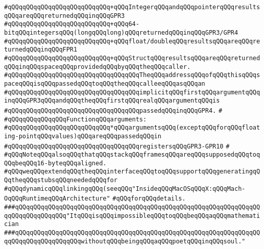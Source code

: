 \verb|#qQQqqQQqqQQqqQQqqQQqqQQqqQQq+qQQqIntegerqQQqandqQQqpointerqQQqresultsqQQqareqQQqreturnedqQQqinqQQqGPR3|\newline
\verb|#qQQqqQQqqQQqqQQqqQQqqQQqqQQq+qQQq64-bitqQQqintegersqQQq(longqQQqlong)qQQqreturnedqQQqinqQQqGPR3/GPR4|\newline
\verb|#qQQqqQQqqQQqqQQqqQQqqQQqqQQq+qQQqfloat/doubleqQQqresultsqQQqareqQQqreturnedqQQqinqQQqFPR1|\newline
\verb|#qQQqqQQqqQQqqQQqqQQqqQQqqQQq+qQQqStructqQQqresultsqQQqareqQQqreturnedqQQqinqQQqspaceqQQqprovidedqQQqbyqQQqtheqQQqcaller.|\newline
\verb|#qQQqqQQqqQQqqQQqqQQqqQQqqQQqqQQqqQQqTheqQQqaddressqQQqofqQQqthisqQQqspaceqQQqisqQQqpassedqQQqtoqQQqtheqQQqcalleeqQQqasqQQqan|\newline
\verb|#qQQqqQQqqQQqqQQqqQQqqQQqqQQqqQQqqQQqimplicitqQQqfirstqQQqargumentqQQqinqQQqGPR3qQQqandqQQqtheqQQqfirstqQQqrealqQQqargumentqQQqis|\newline
\verb|#qQQqqQQqqQQqqQQqqQQqqQQqqQQqqQQqqQQqpassedqQQqinqQQqGPR4.|\newline
\verb|#|\newline
\verb|#qQQqqQQqqQQqqQQqFunctionqQQqarguments:|\newline
\verb|#qQQqqQQqqQQqqQQqqQQqqQQqqQQq*qQQqargumentsqQQq(exceptqQQqforqQQqfloating-pointqQQqvalues)qQQqareqQQqpassedqQQqin|\newline
\verb|#qQQqqQQqqQQqqQQqqQQqqQQqqQQqqQQqqQQqregistersqQQqGPR3-GPR10|\newline
\verb|#|\newline
\verb|#qQQqNoteqQQqalsoqQQqthatqQQqstackqQQqframesqQQqareqQQqsupposedqQQqtoqQQqbeqQQq16-byteqQQqaligned.|\newline
\newline
\newline
\verb|#qQQqweqQQqextendqQQqtheqQQqinterfaceqQQqtoqQQqsupportqQQqgeneratingqQQqtheqQQqstubsqQQqneededqQQqfor|\newline
\verb|#qQQqdynamicqQQqlinkingqQQq(seeqQQq"InsideqQQqMacOSqQQqX:qQQqMach-OqQQqRuntimeqQQqArchitecture"|\newline
\verb|#qQQqforqQQqdetails.|\newline
\newline
\newline
\newline
\verb|###qQQqqQQqqQQqqQQqqQQqqQQqqQQqqQQqqQQqqQQqqQQqqQQqqQQqqQQqqQQqqQQqqQQqqQQqqQQqqQQqqQQq"ItqQQqisqQQqimpossibleqQQqtoqQQqbeqQQqaqQQqmathematician|\newline
\verb|###qQQqqQQqqQQqqQQqqQQqqQQqqQQqqQQqqQQqqQQqqQQqqQQqqQQqqQQqqQQqqQQqqQQqqQQqqQQqqQQqqQQqqQQqwithoutqQQqbeingqQQqaqQQqpoetqQQqinqQQqsoul."|\newline
